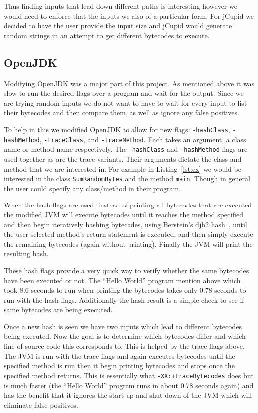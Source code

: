 Thus finding inputs that lead down different paths is interesting however we would need to enforce that the inputs we also of a particular form. For jCupid we decided to have the user provide the input size and jCupid would generate random strings in an attempt to get different bytecodes to execute.

\subsection{OpenJDK}\label{sec:OpenJDK}

Modifying OpenJDK was a major part of this project. As mentioned above it was slow to run the desired flags over a program and wait for the output. Since we are trying random inputs we do not want to have to wait for every input to list their bytecodes and then compare them, as well as ignore any false positives.

To help in this we modified OpenJDK to allow for new flags: \texttt{-hashClass}, \texttt{-hashMethod}, \texttt{-traceClass}, and \texttt{-traceMethod}. Each takes an argument, a class name or method name respectively. The \texttt{-hashClass} and \texttt{-hashMethod} flags are used together as are the trace variants. Their arguments dictate the class and method that we are interested in. For example in Listing~\ref{lst:ex} we would be interested in the class \texttt{SumRandomBytes} and the method \texttt{main}. Though in general the user could specify any class/method in their program. 

When the hash flags are used, instead of printing all bytecodes that are executed the modified JVM will execute bytecodes until it reaches the method specified and then begin iteratively hashing bytecodes, using Berstein's djb2 hash~\cite{djb2Hash}, until the user selected method's  return statement is executed, and then simply execute the remaining bytecodes (again without printing). Finally the JVM will print the resulting hash. 

These hash flags provide a very quick way to verify whether the same bytecodes have been executed or not. The ``Hello World'' program mention above which took 8.6 seconds to run when printing the bytecodes takes only 0.78 seconds to run with the hash flags. Additionally the hash result is a simple check to see if same bytecodes are being executed.

Once a new hash is seen we have two inputs which lead to different bytecodes being executed. Now the goal is to determine which bytecodes differ and which line of source code this corresponds to. This is helped by the trace flags above. The JVM is run with the trace flags and again executes bytecodes until the specified method is run then it begin printing bytecodes and stops once the specified method returns. This is essentially what \texttt{-XX:+TraceBytecodes} does but is much faster (the ``Hello World'' program runs in about 0.78 seconds again) and has the benefit that it ignores the start up and shut down of the JVM which will eliminate false positives.

